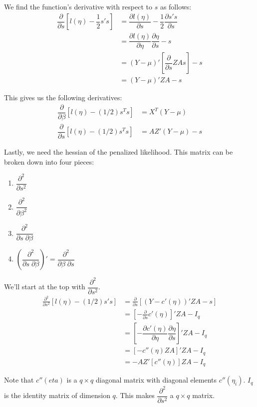\documentclass{article}
\begin{document}
We find the function's derivative with respect to $s$ as follows:
\begin{align}
\dfrac{\partial }{\partial s} \left[ l(\eta) -\dfrac{1}{2} s's   \right] &= \dfrac{\partial l(\eta)}{\partial s} -\dfrac{1}{2} \dfrac{\partial s's}{\partial s}\\
&= \dfrac{\partial l(\eta)}{\partial \eta} \dfrac{\partial \eta}{\partial s} -s\\
&= (Y-\mu)' \left[ \dfrac{\partial}{\partial s} ZAs \right] -s\\
&=(Y-\mu)'ZA -s
\end{align}

This gives us the following derivatives:
\begin{align}
\dfrac{\partial}{\partial \beta} \left[ l(\eta)-(1/2)s^Ts \right]&= X^T (Y-\mu)\\
\dfrac{\partial}{\partial s} \left[ l(\eta)-(1/2)s^Ts \right]&= AZ' (Y-\mu)  -s
\end{align}

Lastly, we need the hessian of the penalized likelihood. This matrix can be broken down into four pieces: 
\begin{enumerate}
\item $ \dfrac{\partial^2}{\partial s^2}$
\item $ \dfrac{\partial^2}{\partial \beta^2}$
\item $\dfrac{\partial^2}{ \partial s \; \partial \beta}$
\item $\left(\dfrac{\partial^2}{ \partial s \; \partial \beta}\right) ' =\dfrac{\partial^2}{ \partial \beta \; \partial s}$
\end{enumerate}

We'll start at the top with  $ \dfrac{\partial^2}{\partial s^2}$.
\begin{align}
  \frac{\partial^2}{\partial s^2}  \left[ l(\eta) - (1/2) s's   \right] &=   \frac{\partial}{\partial s} \left[ (Y-c'(\eta))'ZA -s   \right]\\
&=\left[- \frac{\partial}{\partial s} c'(\eta)\right]'ZA - I_q \\
&= \left[-\dfrac{\partial c'(\eta)}{\partial \eta} \dfrac{\partial \eta}{\partial s}   \right] 'ZA - I_q \\
&= \left[ -c''(\eta) ZA  \right]'ZA - I_q \\
&= -AZ' \left[ c''(\eta) \right] ZA - I_q
\end{align}

Note that $c''(eta)$ is a $q\times q$ diagonal matrix with diagonal elements $c''(\eta_i)$.  $I_q$ is the identity matrix of dimension $q$.  This makes  $ \dfrac{\partial^2}{\partial s^2}$ a $q \times q$ matrix.
\end{document}
